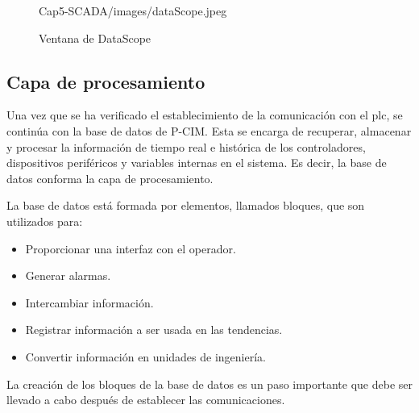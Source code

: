 \begin{itemize}
\begin{figure}[!ht]
	{Cap5-SCADA/images/dataScope.jpeg}
	\caption{Ventana de DataScope}
	\label{fig:dataScope}
  \end{figure}
\end{itemize}


\subsection{Capa de procesamiento}
\label{subsec:CapaProcesamiento}

Una vez que se ha verificado el establecimiento de la comunicación
con el \gls{plc}, se continúa con la base de datos de P-CIM. Esta se encarga
de recuperar, almacenar y procesar la información de tiempo real e histórica de 
los controladores, dispositivos periféricos y variables internas en el sistema. 
Es decir, la base de datos conforma la capa de procesamiento.

La base de datos está formada por elementos, llamados bloques, que son
utilizados para:
\begin{itemize}
 \item Proporcionar una interfaz con el operador.
 \item Generar alarmas.
 \item Intercambiar información.
 \item Registrar información a ser usada en las tendencias.
 \item Convertir información en unidades de ingeniería.
\end{itemize}
La creación de los bloques de la base de datos es un paso importante que 
debe ser llevado a cabo después de establecer las comunicaciones.

